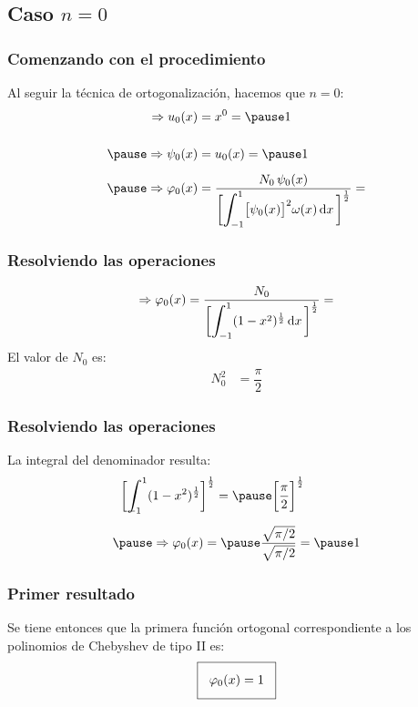\documentclass[12pt]{beamer}
\begin{document}
\subsection{Caso \texorpdfstring{$n=0$}{n=0}}

\begin{frame}
\frametitle{Comenzando con el procedimiento}
Al seguir la técnica de ortogonalización, \pause hacemos que $n = 0$:
\pause
\begin{eqnarray*}
\begin{aligned}
\Rightarrow u_{0} (x) &=  x^{0} = \pause 1 \\[0.5cm] \pause
\Rightarrow \psi_{0} (x) &= u_{0} (x) = \pause  1 \\[0.5em] \pause
\Rightarrow \varphi_{0} (x) &= \dfrac{N_{0} \, \psi_{0} (x)}{\bigg[ \scaleint{6ex}_{\bs -1}^{1} \big[ \psi_{0} (x) \big]^{2} \omega (x) \dd{x} \bigg]^{\frac{1}{2}}} = 
\end{aligned}
\end{eqnarray*}
\end{frame}
\begin{frame}
\frametitle{Resolviendo las operaciones}
\begin{align*}
\Rightarrow \varphi_{0} (x) = \dfrac{N_{0}}{\bigg[ \scaleint{6ex}_{\bs -1}^{1} (1 -x^{2})^{\frac{1}{2}} \dd{x} \bigg]^{\frac{1}{2}}} =
\end{align*}
El valor de $N_{0}$ es:
\pause
\begin{align*}
N_{0}^{2} &= \dfrac{\pi}{2}
\end{align*}
\end{frame}
\begin{frame}
\frametitle{Resolviendo las operaciones}
La integral del denominador resulta:
\pause
\begin{eqnarray*}
\begin{aligned}
\bigg[ \scaleint{6ex}_{\bs \bs -1}^{1} (&1 - x^{2})^{\frac{1}{2}} \bigg]^{\frac{1}{2}} = \pause \bigg[ \dfrac{\pi}{2} \bigg]^{\frac{1}{2}} \\[0.5em] \pause
&\Rightarrow \varphi_{0}(x) = \pause \dfrac{\sqrt{\pi/2}}{\sqrt{\pi/2}} = \pause 1
\end{aligned}
\end{eqnarray*}
\end{frame}
\begin{frame}
\frametitle{Primer resultado}
Se tiene entonces que la primera función ortogonal correspondiente a los polinomios de Chebyshev de tipo II es:
\pause
\begin{align*}
\setlength{\fboxsep}{3\fboxsep}\boxed{
\varphi_{0} (x) = 1}
\end{align*}
\end{frame}
\end{document}
